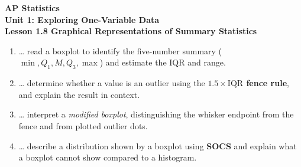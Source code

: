 \documentclass[10pt]{article}
\begin{document}
\vspace{-0.8in}

\begin{center}
  {\color{white}\textbf{\LARGE AP Statistics}}\\[4pt]
  {\color{skymid}\large\textbf{Unit 1: Exploring One-Variable Data}}\\[6pt]
  {\color{white}\textbf{\large Lesson 1.8 \quad Graphical Representations of Summary Statistics}}
\end{center}

\vspace{0.22in}

\namedateperiod

\vspace{0.18in}

\begin{learningtargetbox}
\small
\begin{enumerate}[leftmargin=1.5em, itemsep=5pt]
  \item \ldots{} read a boxplot to identify the five-number summary
        ($\min, Q_1, M, Q_3, \max$) and estimate the IQR and range.
  \item \ldots{} determine whether a value is an outlier using the
        \textbf{$1.5 \times \text{IQR}$ fence rule}, and explain the result in context.
  \item \ldots{} interpret a \textit{modified boxplot}, distinguishing the
        whisker endpoint from the fence and from plotted outlier dots.
  \item \ldots{} describe a distribution shown by a boxplot using \textbf{SOCS}
        and explain what a boxplot cannot show compared to a histogram.
\end{enumerate}
\end{learningtargetbox}

\vspace{0.14in}
\end{document}
